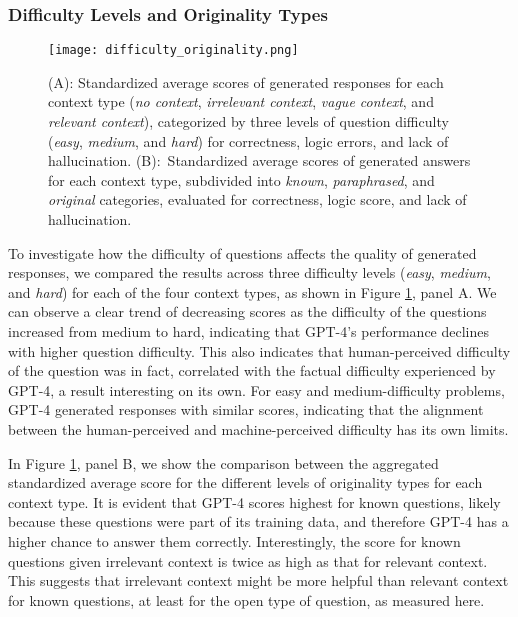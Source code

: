 \documentclass{article}
\begin{document}
\subsubsection{Difficulty Levels and Originality Types}

    \begin{figure}
        \centering
        \texttt{[image: difficulty\_originality.png]}
        \caption{(A): Standardized average scores of generated responses for each context type (\emph{no context}, \emph{irrelevant context}, \emph{vague context}, and \emph{relevant context}), categorized by three levels of question difficulty (\emph{easy}, \emph{medium}, and \emph{hard}) for correctness, logic errors, and lack of hallucination. (B):~Standardized average scores of generated answers for each context type, subdivided into \emph{known}, \emph{paraphrased}, and \emph{original} categories, evaluated for correctness, logic score, and lack of hallucination.} 
        \label{fig:difficulty_originality}
    \end{figure}
    
    To investigate how the difficulty of questions affects the quality of generated responses, we compared the results across three difficulty levels (\emph{easy}, \emph{medium}, and \emph{hard}) for each of the four context types, as shown in Figure \ref{fig:difficulty_originality}, panel A. We can observe a clear trend of decreasing scores as the difficulty of the questions increased from medium to hard, indicating that GPT-4's performance declines with higher question difficulty.
    This also indicates that human-perceived difficulty of the question was in fact, correlated with the factual difficulty experienced by GPT-4, a result interesting on its own.
    For easy and medium-difficulty problems, GPT-4 generated responses with similar scores, indicating that the alignment between the human-perceived and machine-perceived difficulty has its own limits.
    

    In Figure \ref{fig:difficulty_originality}, panel B, we show the comparison between the aggregated standardized average score for the different levels of originality types for each context type. It is evident that GPT-4 scores highest for known questions, likely because these questions were part of its training data, and therefore GPT-4 has a higher chance to answer them correctly. Interestingly, the score for known questions given irrelevant context is twice as high as that for relevant context. This suggests that irrelevant context might be more helpful than relevant context for known questions, at least for the open type of question, as measured here.
\end{document}
